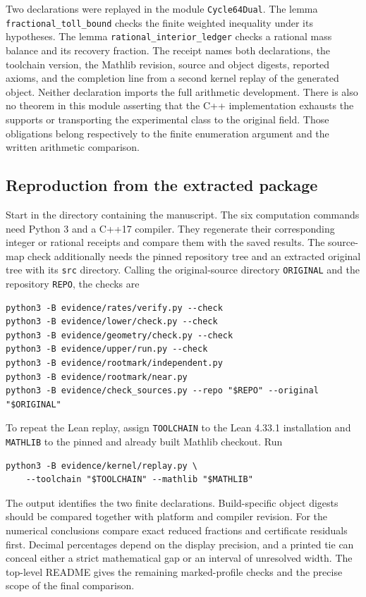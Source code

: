 \documentclass[12pt,letterpaper]{article}
\begin{document}
\begingroup\raggedright
Two declarations were replayed in the module \texttt{Cycle64Dual}. The lemma \texttt{fractional\_toll\_bound} checks the finite weighted inequality under its hypotheses. The lemma \texttt{rational\_interior\_ledger} checks a rational mass balance and its recovery fraction. The receipt names both declarations, the toolchain version, the Mathlib revision, source and object digests, reported axioms, and the completion line from a second kernel replay of the generated object. Neither declaration imports the full arithmetic development. There is also no theorem in this module asserting that the C++ implementation exhausts the supports or transporting the experimental class to the original field. Those obligations belong respectively to the finite enumeration argument and the written arithmetic comparison.\par\endgroup

\subsection{Reproduction from the extracted package}

Start in the directory containing the manuscript. The six computation commands need Python 3 and a C++17 compiler. They regenerate their corresponding integer or rational receipts and compare them with the saved results. The source-map check additionally needs the pinned repository tree and an extracted original tree with its \texttt{src} directory. Calling the original-source directory \texttt{ORIGINAL} and the repository \texttt{REPO}, the checks are
\begin{verbatim}
python3 -B evidence/rates/verify.py --check
python3 -B evidence/lower/check.py --check
python3 -B evidence/geometry/check.py --check
python3 -B evidence/upper/run.py --check
python3 -B evidence/rootmark/independent.py
python3 -B evidence/rootmark/near.py
python3 -B evidence/check_sources.py --repo "$REPO" --original "$ORIGINAL"
\end{verbatim}
To repeat the Lean replay, assign \texttt{TOOLCHAIN} to the Lean 4.33.1 installation and \texttt{MATHLIB} to the pinned and already built Mathlib checkout. Run
\begin{verbatim}
python3 -B evidence/kernel/replay.py \
    --toolchain "$TOOLCHAIN" --mathlib "$MATHLIB"
\end{verbatim}
The output identifies the two finite declarations. Build-specific object digests should be compared together with platform and compiler revision. For the numerical conclusions compare exact reduced fractions and certificate residuals first. Decimal percentages depend on the display precision, and a printed tie can conceal either a strict mathematical gap or an interval of unresolved width. The top-level README gives the remaining marked-profile checks and the precise scope of the final comparison.
\end{document}

